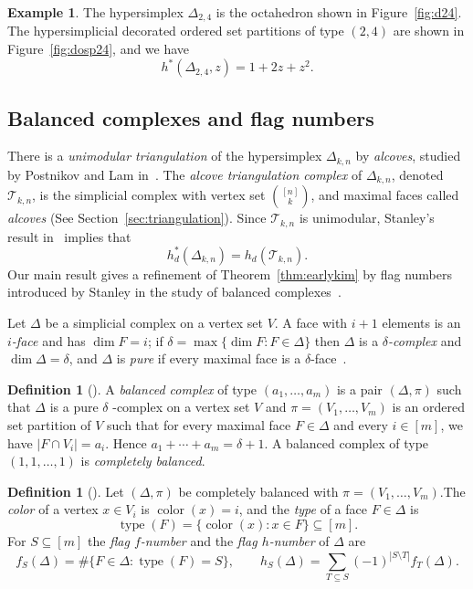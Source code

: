 \documentclass[12pt,reqno]{amsart}
\theoremstyle{plain}
\theoremstyle{definition}
\newtheorem{definition}[theorem]{Definition}
\newtheorem{example}[theorem]{Example}
\newcommand{\hyp}{\Delta_{k,n}}
\newcommand{\Tri}{\mathcal{T}_{k,n}}
\DeclareMathOperator{\typ}{type}
\DeclareMathOperator{\col}{color}
\begin{document}
\begin{example}\label{ex:d24}
	The hypersimplex $ \Delta_{2,4} $
	is the octahedron shown in Figure~\ref{fig:d24}.
	The hypersimplicial decorated ordered set partitions of type $ (2,4) $
	are shown in Figure~\ref{fig:dosp24}, and we have
	\[
		h^*(\Delta_{2,4},z) = 1 + 2z + z^2.
	\]
\end{example}

\subsection{Balanced complexes and flag numbers}\label{ss:balanced-flag}
There is a \emph{unimodular triangulation} of the hypersimplex $\hyp$ by \emph{alcoves}, studied by Postnikov and Lam
in~\cite{alcove1}. The \emph{alcove triangulation complex} of $\hyp$, denoted $\Tri$, is the simplicial complex with
vertex set $\binom{[n]}{k}$, and maximal faces called \emph{alcoves} (See Section~\ref{sec:triangulation}). Since
$\Tri$ is unimodular, Stanley's result in~\cite{stanley80} implies that \[h^*_d(\hyp) = h_d(\Tri).\] Our main result gives a refinement of Theorem~\ref{thm:earlykim} by flag numbers introduced by Stanley in the study
   of balanced complexes~\cite{Stanley1979}.

Let $\Delta $ be a simplicial complex on a vertex set $ V $. A face with $ i+1 $ elements is an \emph{ $ i $-face} and
has $ \dim F=i $; if $ \delta=\max\{\dim F:F\in\Delta\} $ then $ \Delta $ is a \emph{$ \delta $-complex} and $
\dim\Delta=\delta $, and $ \Delta $ is \emph{pure} if every maximal face is a $ \delta $-face~\cite[\S1]{Stanley1979}.

\begin{definition}[{\cite[\S2]{Stanley1979}}]\label{def:balanced}
	A \emph{balanced complex} of type $ (a_1,\dots,a_m) $ is a pair $ (\Delta,\pi) $ such that $ \Delta $ is a pure $ \delta $
	-complex on a vertex set $ V $ and $\pi=(V_1,\ldots, V_m)$ is an ordered set partition of $ V $
	such that for every maximal face $ F\in\Delta $ and every $ i\in[m] $, we have $ |F\cap V_i|=a_i $. Hence $
		a_1+\cdots+a_m=\delta+1 $.
	A balanced complex of type $ (1,1,\dots,1) $
	is \emph{completely balanced}.
\end{definition}

\begin{definition}[{\cite[\S3]{Stanley1979}}]\label{def:flag}
	Let $ (\Delta,\pi) $
	be completely balanced with $\pi = (V_1, \ldots,V_m)$.The \emph{color} of a vertex $ x\in V_i $ is $ \col(x)=i $, and the \emph{type} of a face $ F\in\Delta $ is
	\begin{equation}
		\typ(F)=\{\col(x):x\in F\}\subseteq[m].
	\end{equation}
	For $ S\subseteq[m] $ the \emph{flag $ f $-number} and the \emph{flag $ h $-number} of $ \Delta $ are
	\begin{equation}\label{eq:flagnumbers}
		f_S(\Delta)=\#\{F\in\Delta:\typ(F)=S\},\qquad
		h_S(\Delta)=\sum_{T\subseteq S}(-1)^{|S\setminus T|}f_T(\Delta).
	\end{equation}
\end{definition}
\end{document}
